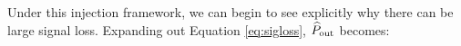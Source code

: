 \documentclass[preprint2,numberedappendix,tighten]{aastex6}
\newcommand{\x}{\mathbf{x}}
\newcommand{\f}{\mathbf{f}}
\newcommand{\s}{\mathbf{s}}
\newcommand{\p}{\mathbf{p}}
\newcommand{\phat}{\widehat{\mathbf{p}}}
\newcommand{\cc}[1]{{\color{purple} \textbf{[CC: #1]}}}
\begin{document}

Under this injection framework, we can begin to see explicitly why there can be large signal loss. Expanding out Equation \eqref{eq:sigloss}, $\widehat{P}_{\rm out}$ becomes:

%
%
\end{document}
